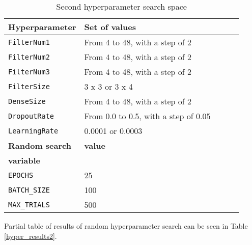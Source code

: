 \begin{table}
    \centering
    \begin{tabular}{@{} *5l @{}}    \toprule
        \textbf{Hyperparameter} & \textbf{Set of values}\\\midrule
        \verb|FilterNum1|       & From 4 to 48, with a step of 2\\ 
        \verb|FilterNum2|       & From 4 to 48, with a step of 2\\ 
        \verb|FilterNum3|       & From 4 to 48, with a step of 2\\
        \verb|FilterSize|       & 3 x 3 or 3 x 4\\
        \verb|DenseSize|        & From 4 to 48, with a step of 2\\
        \verb|DropoutRate|      & From 0.0 to 0.5, with a step of 0.05\\
        \verb|LearningRate|     & 0.0001 or 0.0003\\\toprule
        \textbf{Random search}  & \textbf{value}\\
        \textbf{variable}       & \\\midrule
        \verb|EPOCHS|           & 25\\
        \verb|BATCH_SIZE|       & 100\\
        \verb|MAX_TRIALS|       & 500\\\bottomrule
    \end{tabular}
    \caption{ Second hyperparameter search space}
    \label{hyper_table2}
\end{table}

Partial table of results of random hyperparameter search can be seen in Table \ref{hyper_results2}.

